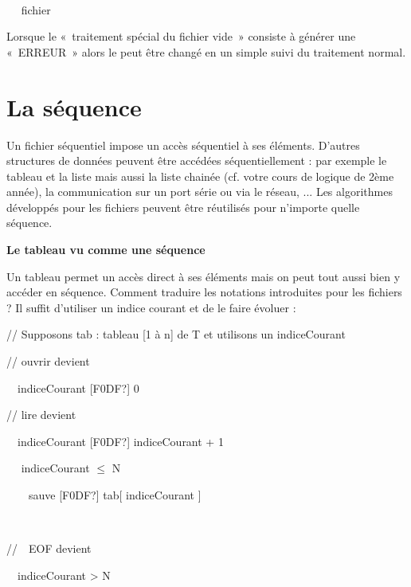 {\sffamily
\ \  }

{\sffamily
\ \  fichier}

{\sffamily
{} }

{
Lorsque le «~traitement spécial du fichier vide~» consiste à générer une
«~ERREUR~» alors le  peut être changé
en un simple  suivi du traitement normal.}

\section{La séquence}
{
Un fichier séquentiel impose un accès séquentiel à ses éléments.
D'autres structures de données peuvent être accédées
séquentiellement : par exemple le tableau et la liste mais aussi la
liste chainée (cf. votre cours de logique de 2ème année), la
communication sur un port série ou via le réseau, ... Les algorithmes
développés pour les fichiers peuvent être réutilisés pour
n'importe quelle séquence.}

{\sffamily\bfseries\upshape
Le tableau vu comme une séquence}

{
Un tableau permet un accès direct à ses éléments mais on peut tout aussi
bien y accéder en séquence. Comment traduire les notations introduites
pour les fichiers ? Il suffit d'utiliser un indice
courant et de le faire évoluer :}

{\sffamily
// Supposons tab : tableau [1 à n] de T et utilisons un indiceCourant}


\bigskip

{\sffamily
// ouvrir devient}

{\sffamily
\ \ indiceCourant {\textrm{[F0DF?]}} 0}


\bigskip

{\sffamily
// lire devient}

{\sffamily
\ \ indiceCourant {\textrm{[F0DF?]}}
indiceCourant + 1}

{\sffamily
\ \  indiceCourant ${\leq}$ N }

{\sffamily
\ \ \ \ sauve {\textrm{[F0DF?]}} tab[
indiceCourant ]}

{\sffamily
\ \  }


\bigskip

{\sffamily
//\ \ EOF devient}

{\sffamily
\ \ indiceCourant {\textgreater} N}

